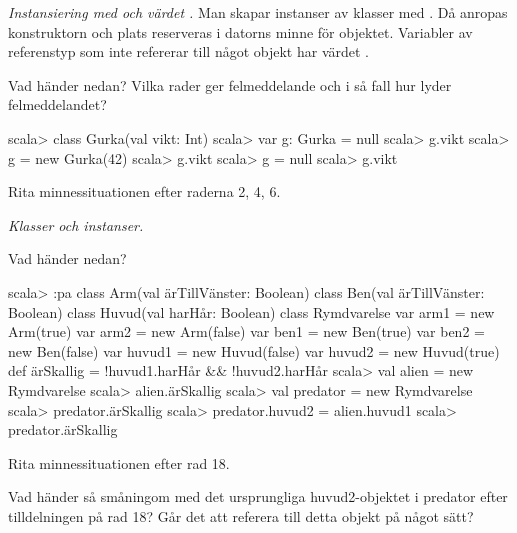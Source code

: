 

\Exercise{\ExeWeekSIX}\label{exe:W06}

\begin{Goals}

\end{Goals}

\begin{Preparations}
\item {}
\end{Preparations}

\BasicTasks %

\Task \emph{Instansiering med  och värdet .} Man skapar instanser av klasser med . Då anropas konstruktorn och plats reserveras i datorns minne för objektet. Variabler av referenstyp som inte refererar till något objekt har värdet .

\Subtask Vad händer nedan? Vilka rader ger felmeddelande och i så fall hur lyder felmeddelandet?

\begin{REPL}
scala> class Gurka(val vikt: Int)
scala> var g: Gurka = null
scala> g.vikt
scala> g = new Gurka(42)
scala> g.vikt
scala> g = null
scala> g.vikt
\end{REPL}

\Subtask\Pen Rita minnessituationen efter raderna 2, 4, 6.

\Task \emph{Klasser och instanser.}

\Subtask Vad händer nedan?
\begin{REPL}
scala> :pa
class Arm(val ärTillVänster: Boolean)
class Ben(val ärTillVänster: Boolean)
class Huvud(val harHår: Boolean)
class Rymdvarelse {
  var arm1 = new Arm(true)
  var arm2 = new Arm(false)
  var ben1 = new Ben(true)
  var ben2 = new Ben(false)
  var huvud1 = new Huvud(false)
  var huvud2 = new Huvud(true)
  def ärSkallig = !huvud1.harHår && !huvud2.harHår
}
scala> val alien = new Rymdvarelse
scala> alien.ärSkallig
scala> val predator = new Rymdvarelse
scala> predator.ärSkallig
scala> predator.huvud2 = alien.huvud1
scala> predator.ärSkallig
\end{REPL}

\Subtask\Pen Rita minnessituationen efter rad 18.

\Subtask\Pen Vad händer så småningom med det ursprungliga huvud2-objektet i predator efter tilldelningen på rad 18? Går det att referera till detta objekt på något sätt?


